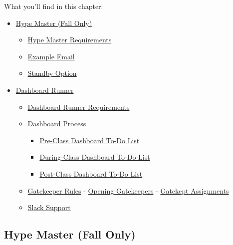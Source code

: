 \documentclass[
]{article}
\providecommand{\tightlist}{%
  \setlength{\itemsep}{0pt}\setlength{\parskip}{0pt}}
\begin{document}
What you'll find in this chapter:

\begin{itemize}
\tightlist
\item
  \protect\hyperlink{hype-master-fall-only}{Hype Master (Fall Only)}

  \begin{itemize}
  \tightlist
  \item
    \protect\hyperlink{hype-master-requirements}{Hype Master Requirements}
  \item
    \protect\hyperlink{example-email}{Example Email}
  \item
    \protect\hyperlink{standby-option}{Standby Option}
  \end{itemize}
\item
  \protect\hyperlink{dashboard-runner}{Dashboard Runner}

  \begin{itemize}
  \tightlist
  \item
    \protect\hyperlink{dashboard-runner-requirements}{Dashboard Runner Requirements}
  \item
    \protect\hyperlink{dashboard-process}{Dashboard Process}

    \begin{itemize}
    \tightlist
    \item
      \protect\hyperlink{pre-class-dashboard-to-do-list}{Pre-Class Dashboard To-Do List}
    \item
      \protect\hyperlink{during-class-dashboard-to-do-list}{During-Class Dashboard To-Do List}
    \item
      \protect\hyperlink{post-class-dashboard-to-do-list}{Post-Class Dashboard To-Do List}
    \end{itemize}
  \item
    \protect\hyperlink{gatekeeper-rules}{Gatekeeper Rules}
    - \protect\hyperlink{opening-gatekeepers}{Opening Gatekeepers}
    - \protect\hyperlink{gatekept-assignments}{Gatekept Assignments}
  \item
    \protect\hyperlink{slack-support}{Slack Support}
  \end{itemize}
\end{itemize}

\hypertarget{hype-master-fall-only}{%
\subsection{Hype Master (Fall Only)}\label{hype-master-fall-only}}
\end{document}
